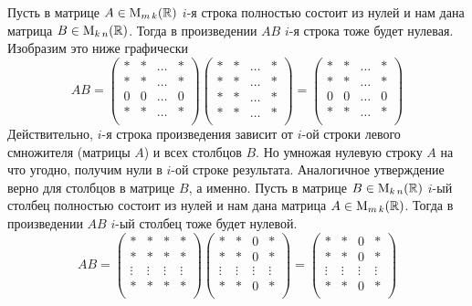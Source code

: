 Пусть в матрице $A\in \operatorname{M}_{m\,k}(\mathbb R)$ $i$-я строка полностью состоит из нулей и нам дана матрица $B\in \operatorname{M}_{k\,n}(\mathbb R)$.
Тогда в произведении $AB$ $i$-я строка тоже будет нулевая.
Изобразим это ниже графически
\[
AB =
\begin{pmatrix}
{*}&{*}&{\ldots}&{*}\\
{*}&{*}&{\ldots}&{*}\\
{0}&{0}&{\ldots}&{0}\\
{*}&{*}&{\ldots}&{*}\\
\end{pmatrix}
\begin{pmatrix}
{*}&{*}&{\ldots}&{*}\\
{*}&{*}&{\ldots}&{*}\\
{*}&{*}&{\ldots}&{*}\\
{*}&{*}&{\ldots}&{*}\\
\end{pmatrix}
=
\begin{pmatrix}
{*}&{*}&{\ldots}&{*}\\
{*}&{*}&{\ldots}&{*}\\
{0}&{0}&{\ldots}&{0}\\
{*}&{*}&{\ldots}&{*}\\
\end{pmatrix}
\]
Действительно, $i$-я строка произведения зависит от $i$-ой строки левого смножителя (матрицы $A$) и всех столбцов $B$.
Но умножая нулевую строку $A$ на что угодно, получим нули в $i$-ой строке результата.
Аналогичное утверждение верно для столбцов в матрице $B$, а именно.
Пусть в матрице $B\in \operatorname{M}_{k\,n}(\mathbb R)$ $i$-ый столбец полностью состоит из нулей и нам дана матрица $A\in \operatorname{M}_{m\,k}(\mathbb R)$.
Тогда в произведении $AB$ $i$-ый столбец тоже будет нулевой.
\[
AB =
\begin{pmatrix}
{*}&{*}&{*}&{*}\\
{*}&{*}&{*}&{*}\\
{\vdots}&{\vdots}&{\vdots}&{\vdots}\\
{*}&{*}&{*}&{*}\\
\end{pmatrix}
\begin{pmatrix}
{*}&{*}&{0}&{*}\\
{*}&{*}&{0}&{*}\\
{\vdots}&{\vdots}&{\vdots}&{\vdots}\\
{*}&{*}&{0}&{*}\\
\end{pmatrix}
=
\begin{pmatrix}
{*}&{*}&{0}&{*}\\
{*}&{*}&{0}&{*}\\
{\vdots}&{\vdots}&{\vdots}&{\vdots}\\
{*}&{*}&{0}&{*}\\
\end{pmatrix}
\]

